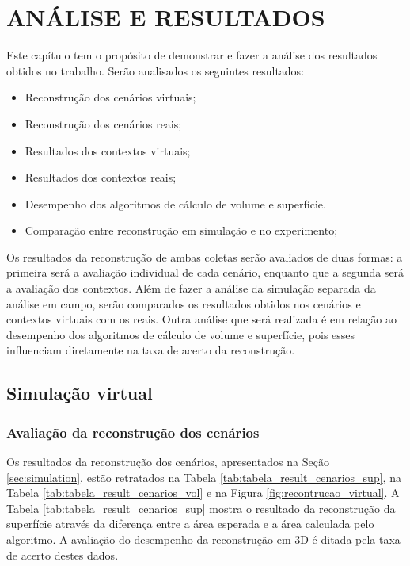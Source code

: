 
\chapter{ANÁLISE E RESULTADOS}
\label{chap:resultados}

Este capítulo tem o propósito de demonstrar e fazer a análise dos resultados obtidos no trabalho.
Serão analisados os seguintes resultados:

\begin{itemize}
    \vspace{0.5em}
    \item Reconstrução dos cenários virtuais;
    \item Reconstrução dos cenários reais;
    \item Resultados dos contextos virtuais;
    \item Resultados dos contextos reais;
    \item Desempenho dos algoritmos de cálculo de volume e superfície.
    \item Comparação entre reconstrução em simulação e no experimento;
\end{itemize}
\vspace{1em}

Os resultados da reconstrução de ambas coletas serão avaliados de duas formas: a primeira será a avaliação individual de cada cenário, enquanto que a segunda será a avaliação dos contextos.
Além de fazer a análise da simulação separada da análise em campo, serão comparados os resultados obtidos nos cenários e contextos virtuais com os reais.
Outra análise que será realizada é em relação ao desempenho dos algoritmos de cálculo de volume e superfície, pois esses influenciam diretamente na taxa de acerto da reconstrução.


\section{Simulação virtual}

\subsection{Avaliação da reconstrução dos cenários}
\label{sec:avaliacao_cenarios_simulacao}

Os resultados da reconstrução dos cenários, apresentados na Seção \ref{sec:simulation}, estão retratados na Tabela  \ref{tab:tabela_result_cenarios_sup}, na Tabela \ref{tab:tabela_result_cenarios_vol} e na Figura \ref{fig:recontrucao_virtual}.
A Tabela \ref{tab:tabela_result_cenarios_sup} mostra o resultado da reconstrução da superfície através da diferença entre a área esperada e a área calculada pelo algoritmo.
A avaliação do desempenho da reconstrução em 3D é ditada pela taxa de acerto destes dados.


